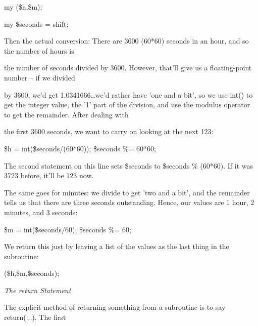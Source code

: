 \documentclass[a4paper,11pt]{book}
\begin{document}
\noindent 

\noindent 

\noindent my (\$h,\$m);

\noindent my \$seconds = shift;

\noindent 

\noindent 

\noindent Then the actual conversion: There are 3600 (60*60) seconds in an hour, and so the number of hours is

\noindent the number of seconds divided by 3600. However, that'll give us a floating-point number -- if we divided

 by 3600, we'd get 1.0341666\dots  we'd rather have 'one and a bit', so we use int() to get the integer value, the '1' part of the division, and use the modulus operator to get the remainder. After dealing with

\noindent the first 3600 seconds, we want to carry on looking at the next 123:

\noindent 

\noindent 

\noindent \$h = int(\$seconds/(60*60)); \$seconds \%= 60*60;

\noindent 

\noindent The second statement on this line sets \$seconds to \$seconds \% (60*60).   If it was 3723 before, it'll be 123 now.

\noindent 

\noindent The same goes for minutes: we divide to get 'two and a bit', and the remainder tells us that there are three seconds outstanding. Hence, our values are 1 hour, 2 minutes, and 3 seconds:

\noindent 

\noindent 

\noindent \$m = int(\$seconds/60); \$seconds \%= 60;

\noindent 

\noindent We return this just by leaving a list of the values as the last thing in the subroutine:

\noindent 

\noindent 

\noindent (\$h,\$m,\$seconds);

\noindent 

\noindent \textit{The return Statement}

\noindent The explicit method of returning something from a subroutine is to say return(...).  The first
\end{document}
